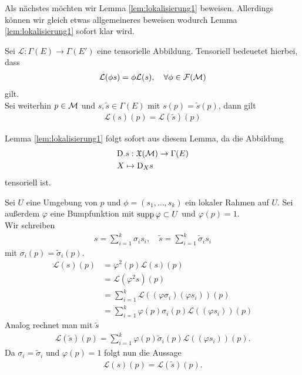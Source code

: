 
Als nächstes möchten wir Lemma \ref{lem:lokalisierung1} beweisen.
Allerdings können wir gleich etwas allgemeineres beweisen wodurch Lemma \ref{lem:lokalisierung1} sofort klar wird.

\begin{lem}
\label{lem:tensorielllokalisierung}
Sei $\mathcal{L}: \Gamma (E) \to \Gamma(E')$ eine tensorielle Abbildung. 
Tensoriell bedeuetet hierbei, dass
\begin{align}
\mathcal{L}(\phi s) = \phi \mathcal{L}(s), \quad \forall \phi \in \mathcal{F}(\mathcal{M})
\end{align}
gilt.\\
Sei weiterhin $p\in \mathcal{M}$ und $s, \tilde{s} \in \Gamma(E)$ mit $s(p) = \tilde{s}(p)$, dann gilt
\begin{align}
\mathcal{L}(s)(p) = \mathcal{L}(\tilde{s})(p)
\end{align} 
\end{lem}
Lemma \ref{lem:lokalisierung1} folgt sofort aus diesem Lemma, da die Abbildung
\begin{align}
&\mathrm{D}_\cdot s : \mathfrak{X}(\mathcal{M}) \to \Gamma (E)\\
& X \mapsto \mathrm{D}_X s
\end{align}
tensoriell ist.

\begin{bew}
Sei $U$ eine Umgebung von $p$ und $\phi = (s_1, \dots, s_k)$ ein lokaler Rahmen auf $U$.
Sei außerdem $\varphi$ eine Bumpfunktion mit $\operatorname{supp} \varphi \subset U$ und $\varphi (p) = 1$.\\
Wir schreiben 
\begin{align}
s = \sum_{i=1}^k \sigma_i s_i , \quad \tilde{s} = \sum_{i=1}^k \tilde{\sigma}_i s_i
\end{align}
mit $\sigma_i (p) = \tilde{\sigma}_i (p)$.
\begin{align}
\mathcal{L}(s)(p) &= \varphi^2 (p) \mathcal{L}(s)(p)\\
&= \mathcal{L}(\varphi^2 s)(p)\\
&= \sum_{i = 1}^k \mathcal{L}((\varphi \sigma_i)(\varphi s_i)) (p)\\
&= \sum_{i = 1}^k \varphi (p) \sigma_i (p) \mathcal{L}((\varphi s_i)) (p) 
\end{align}
Analog rechnet man mit $\tilde{s}$
\begin{align}
\mathcal{L}(\tilde{s})(p) = \sum_{i = 1}^k \varphi (p) \tilde{\sigma}_i (p) \mathcal{L}((\varphi s_i)) (p) .
\end{align}
Da $\sigma_i = \tilde{\sigma}_i$ und $\varphi(p)=1$ folgt nun die Aussage
\begin{align}
\mathcal{L}(s)(p) = \mathcal{L}(\tilde{s})(p).
\end{align}
\end{bew}

